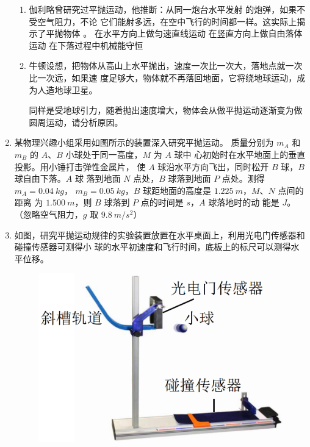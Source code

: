 \begin{enumerate}
\begin{enumerate}
\item 
伽利略曾研究过平抛运动，他推断：从同一炮台水平发射 的炮弹，如果不受空气阻力，不论
它们能射多远，在空中飞行的时间都一样。这实际上揭示了平抛物体  。
\threechoices
{在水平方向上做匀速直线运动}
{在竖直方向上做自由落体运动}
{在下落过程中机械能守恒}

\item 
牛顿设想，把物体从高山上水平抛出，速度一次比一次大，落地点就一次比一次远，如果速
度足够大，物体就不再落回地面，它将绕地球运动，成为人造地球卫星。


同样是受地球引力，随着抛出速度增大，物体会从做平抛运动逐渐变为做圆周运动，请分析原因。


\end{enumerate}




\item
{}
某物理兴趣小组采用如图所示的装置深入研究平抛运动。
质量分别为 $ m_{A} $ 和 $ m_{B} $ 的 $ A $、$ B $ 小球处于同一高度，$ M $ 为 $ A $ 球中
心初始时在水平地面上的垂直投影。用小锤打击弹性金属片，
使 $ A $ 球沿水平方向飞出，同时松开 $ B $ 球，$ B $ 球自由下落。$ A $ 球
落到地面 $ N $ 点处，$ B $ 球落到地面 $ P $ 点处。测得 $ m_{A} =0.04 \ kg $，
$ m_{B} =0.05 \ kg $，$ B $ 球距地面的高度是 $ 1.225 \ m $，$ M $、$ N $ 点间的距离
为 $ 1.500 \ m $，则 $ B $ 球落到 $ P $ 点的时间是  $ s $，$ A $ 球落地时的动
能是  $ J $。（忽略空气阻力，$ g $ 取 $ 9.8 \ m/s^{2} $）
\begin{figure}[h!]
\centering

\end{figure}




\newpage
\item
{}
如图，研究平抛运动规律的实验装置放置在水平桌面上，利用光电门传感器和碰撞传感器可测得小
球的水平初速度和飞行时间，底板上的标尺可以测得水平位移。
\begin{figure}[h!]
\centering
\includegraphics[width=0.3\linewidth]{picture/screenshot031}
\end{figure}


\end{enumerate}
